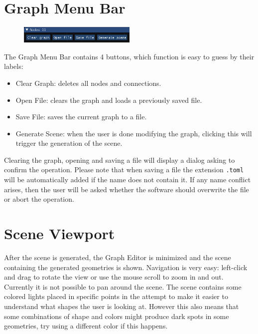 \section{Graph Menu Bar}

\begin{figure}[H]
\centering
\includegraphics[width=0.5\textwidth]{figures/graph_menu_bar.png}
\end{figure}

The Graph Menu Bar contains 4 buttons, which function is easy to guess by their labels:

\begin{itemize}
    \item Clear Graph: deletes all nodes and connections.
    \item Open File: clears the graph and loads a previously saved file.
    \item Save File: saves the current graph to a file.
    \item Generate Scene: when the user is done modifying the graph, clicking this
        will trigger the generation of the scene.
\end{itemize}

Clearing the graph, opening and saving a file will display a dialog asking to confirm the operation.
Please note that when saving a file the extension \texttt{.toml} will be automatically added if
the name does not contain it. If any name conflict arises, then the user will be asked whether
the software should overwrite the file or abort the operation.

\section{Scene Viewport}

After the scene is generated, the Graph Editor is minimized and the scene containing the generated
geometries is shown. Navigation is very easy: left-click and drag to rotate the view or use
the mouse scroll to zoom in and out. Currently it is not possible to pan around the scene.
The scene contains some colored lights placed in specific points in the attempt to make it easier to
understand what shapes the user is looking at. However this also means that some combinations of shape
and colors might produce dark spots in some geometries, try using a different color if this happens.

